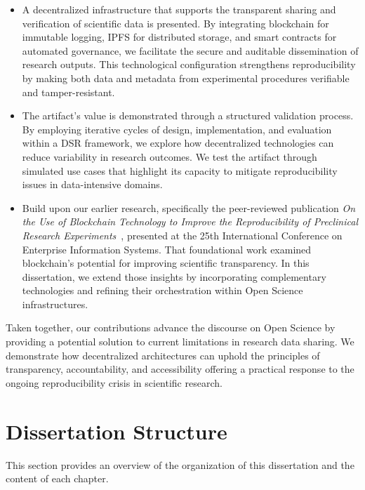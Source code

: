 \documentclass[final]{rc-book-2.14}
\begin{document}
\begin{itemize}
    \item A decentralized infrastructure that supports the transparent sharing and verification of scientific data is presented. By integrating blockchain for immutable logging, IPFS for distributed storage, and smart contracts for automated governance, we facilitate the secure and auditable dissemination of research outputs. This technological configuration strengthens reproducibility by making both data and metadata from experimental procedures verifiable and tamper-resistant.
    \item The artifact's value is demonstrated through a structured validation process. By employing iterative cycles of design, implementation, and evaluation within a DSR framework, we explore how decentralized technologies can reduce variability in research outcomes. We test the artifact through simulated use cases that highlight its capacity to mitigate reproducibility issues in data-intensive domains.
    \item Build upon our earlier research, specifically the peer-reviewed publication \textit{On the Use of Blockchain Technology to Improve the Reproducibility of Preclinical Research Experiments}~\cite{oliveira2023blockchain}, presented at the 25th International Conference on Enterprise Information Systems. That foundational work examined blockchain’s potential for improving scientific transparency. In this dissertation, we extend those insights by incorporating complementary technologies and refining their orchestration within Open Science infrastructures.
 
\end{itemize}

Taken together, our contributions advance the discourse on Open Science by providing a potential solution to current limitations in research data sharing. We demonstrate how decentralized architectures can uphold the principles of transparency, accountability, and accessibility offering a practical response to the ongoing reproducibility crisis in scientific research.


\section{Dissertation Structure}
\label{chp:intro:sec:structure}

This section provides an overview of the organization of this dissertation and the content of each chapter.
\end{document}
